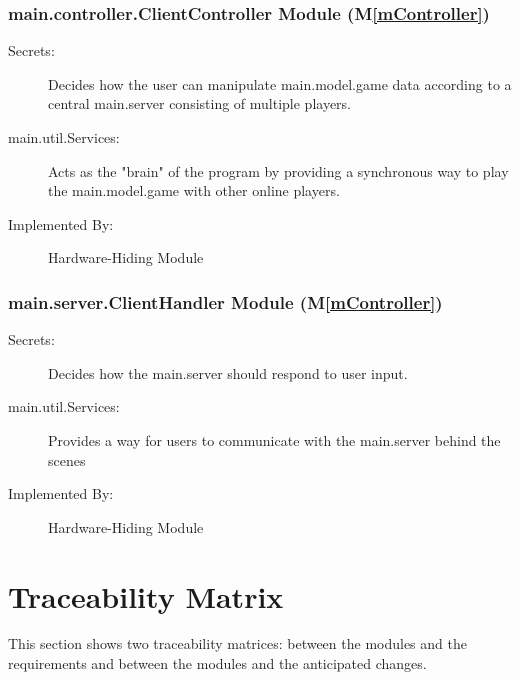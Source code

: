\documentclass[12pt, titlepage]{article}
\newcommand{\mref}[1]{M\ref{#1}}
\begin{document}
\subsubsection{ main.controller.ClientController Module (\mref{mController})}
    \begin{description}
    \item[Secrets:] Decides how the user can manipulate main.model.game data according to a central main.server consisting of multiple players.
    \item[main.util.Services:] Acts as the "brain" of the program by providing a synchronous way to play the main.model.game with other online players.
    \item[Implemented By:] Hardware-Hiding Module
    \end{description}

\subsubsection{ main.server.ClientHandler Module (\mref{mController})}
    \begin{description}
    \item[Secrets:] Decides how the main.server should respond to user input.
    \item[main.util.Services:] Provides a way for users to communicate with the main.server behind the scenes
    \item[Implemented By:] Hardware-Hiding Module
    \end{description}



\section{Traceability Matrix} \label{SecTM}

This section shows two traceability matrices: between the modules and the
requirements and between the modules and the anticipated changes.
\end{document}
